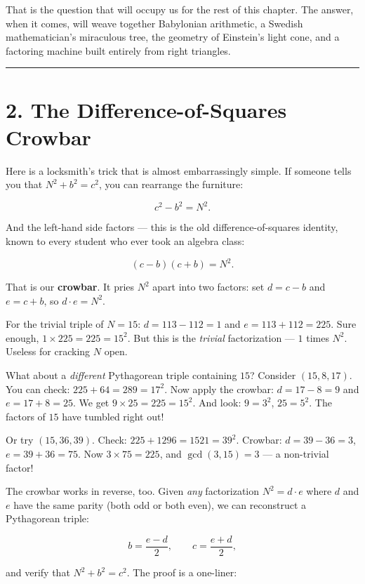 \documentclass[12pt, letterpaper, openany]{book}
\theoremstyle{definition}
\theoremstyle{remark}
\begin{document}
That is the question that will occupy us for the rest of this chapter. The answer, when it comes, will weave together Babylonian arithmetic, a Swedish mathematician's miraculous tree, the geometry of Einstein's light cone, and a factoring machine built entirely from right triangles.


\bigskip\noindent\rule{\textwidth}{0.4pt}\bigskip



\section*{2. The Difference-of-Squares Crowbar}


Here is a locksmith's trick that is almost embarrassingly simple. If someone tells you that $N^2 + b^2 = c^2$, you can rearrange the furniture:

\[
c^2 - b^2 = N^2.
\]

And the left-hand side factors --- this is the old difference-of-squares identity, known to every student who ever took an algebra class:

\[
(c - b)(c + b) = N^2.
\]

That is our \textbf{crowbar}. It pries $N^2$ apart into two factors: set $d = c - b$ and $e = c + b$, so $d \cdot e = N^2$.

For the trivial triple of $N = 15$: $d = 113 - 112 = 1$ and $e = 113 + 112 = 225$. Sure enough, $1 \times 225 = 225 = 15^2$. But this is the \textit{trivial} factorization --- $1$ times $N^2$. Useless for cracking $N$ open.

What about a \textit{different} Pythagorean triple containing $15$? Consider $(15, 8, 17)$. You can check: $225 + 64 = 289 = 17^2$. Now apply the crowbar: $d = 17 - 8 = 9$ and $e = 17 + 8 = 25$. We get $9 \times 25 = 225 = 15^2$. And look: $9 = 3^2$, $25 = 5^2$. The factors of $15$ have tumbled right out!

Or try $(15, 36, 39)$. Check: $225 + 1296 = 1521 = 39^2$. Crowbar: $d = 39 - 36 = 3$, $e = 39 + 36 = 75$. Now $3 \times 75 = 225$, and $\gcd(3, 15) = 3$ --- a non-trivial factor!

The crowbar works in reverse, too. Given \textit{any} factorization $N^2 = d \cdot e$ where $d$ and $e$ have the same parity (both odd or both even), we can reconstruct a Pythagorean triple:

\[
b = \frac{e - d}{2}, \qquad c = \frac{e + d}{2},
\]

and verify that $N^2 + b^2 = c^2$. The proof is a one-liner:
\end{document}
